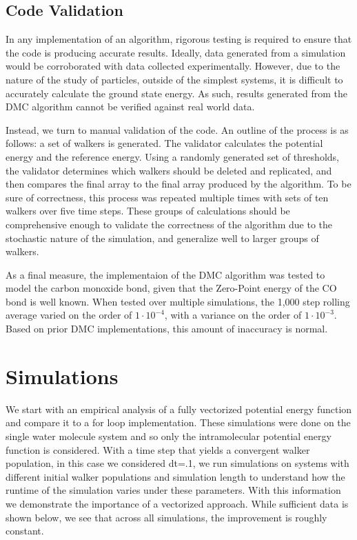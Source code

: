 \documentclass[journal=jacsat,manuscript=article]{achemso}
\begin{document}
\subsection{Code Validation}

In any implementation of an algorithm, rigorous testing is required to ensure that the code is producing accurate results. Ideally, data generated from a simulation would be corroborated with data collected experimentally. However, due to the nature of the study of particles, outside of the simplest systems, it is difficult to accurately calculate the ground state energy. As such, results generated from the DMC algorithm cannot be verified against real world data. 

Instead, we turn to manual validation of the code. An outline of the process is as follows: a set of walkers is generated. The validator calculates the potential energy and the reference energy. Using a randomly generated set of thresholds, the validator determines which walkers should be deleted and replicated, and then compares the final array to the final array produced by the algorithm. To be sure of correctness, this process was repeated multiple times with sets of ten walkers over five time steps. These groups of calculations should be comprehensive enough to validate the correctness of the algorithm due to the stochastic nature of the simulation, and generalize well to larger groups of walkers. 

As a final measure, the implementaion of the DMC algorithm was tested to model the carbon monoxide bond, given that the Zero-Point energy of the CO bond is well known. When tested over multiple simulations, the 1,000 step rolling average varied on the order of  $1\cdot10^{-4}$, with a variance on the order of $1\cdot10^{-3}$. Based on prior DMC implementations, this amount of inaccuracy is normal.  

\section{Simulations}
We start with an empirical analysis of a fully vectorized potential energy function and compare it to a for loop implementation. These simulations were done on the single water molecule system and so only the intramolecular potential energy function is considered. With a time step that yields a convergent walker population, in this case we considered dt=.1, we run simulations on systems with different initial walker populations and simulation length to understand how the runtime of the simulation varies under these parameters. With this information we demonstrate the importance of a vectorized approach. While sufficient data is shown below, we see that across all simulations, the improvement is roughly constant.
\end{document}
